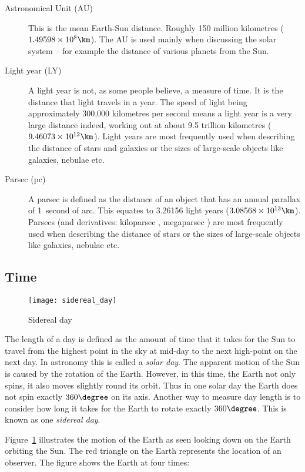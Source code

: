 \begin{description}
\item[Astronomical Unit (AU)] This is the mean Earth-Sun
  distance. Roughly 150 million kilometres
  ($1.49598 \times 10^8\km$). The AU is used mainly when
  discussing the solar system -- for example the distance of various
  planets from the Sun.
\item[Light year (LY)] A light year is not, as some people believe, a
  measure of time. It is the distance that light travels in a
  year. The speed of light being approximately 300,000 kilometres per
  second means a light year is a very large distance indeed, working
  out at about 9.5 trillion kilometres
  ($9.46073\times10^{12}\km$). Light years are most frequently used
  when describing the distance of stars and galaxies or the sizes of
  large-scale objects like galaxies, nebulae etc.
\item[Parsec (pc)] A parsec is defined as the distance of an object
  that has an annual parallax of 1~second of arc. This equates to
  3.26156 light years ($3.08568\times10^{13}\km$). Parsecs (and derivatives: kiloparsec \kpc, megaparsec \Mpc) are most
  frequently used when describing the distance of stars or the sizes
  of large-scale objects like galaxies, nebulae etc.
\end{description}

\subsection{Time}\label{time}

\begin{figure}[ht]
\centering\texttt{[image: sidereal\_day]}
\caption{Sidereal day}
\label{fig:SiderealDay}
\end{figure}

The length of a day is defined as the amount of time that it takes for
the Sun to travel from the highest point in the sky at mid-day to the
next high-point on the next day. In astronomy this is called a
\emph{solar day}. The apparent motion of the Sun is caused by the
rotation of the Earth. However, in this time, the Earth not only spins,
it also moves slightly round its orbit. Thus in one solar day the Earth
does not spin exactly $360\degree$ on its axis. Another way to measure day
length is to consider how long it takes for the Earth to rotate exactly
$360\degree$. This is known as one \emph{sidereal day}.

Figure~\ref{fig:SiderealDay} illustrates the motion of the Earth as
seen looking down on the Earth orbiting the Sun. The red triangle on the
Earth represents the location of an observer. The figure shows the Earth
at four times:

